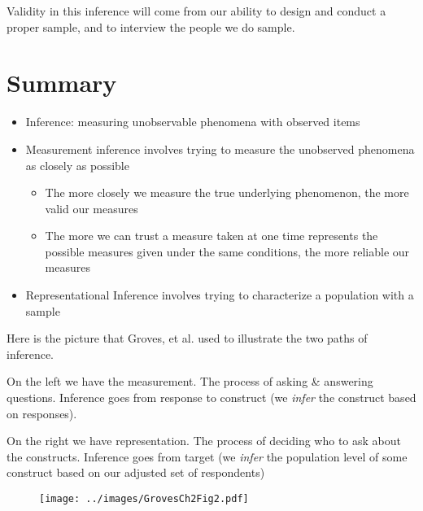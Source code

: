\documentclass[11pt]{lecturenotes}
\begin{document}
Validity in this inference will come from our ability to design and conduct a proper sample, and to interview the people we do sample. 

\section[10]{Summary}
\slide
\begin{itemize}
\item Inference: measuring unobservable phenomena with observed items
\item Measurement inference involves trying to measure the unobserved phenomena as closely as possible
\begin{itemize}
\item The more closely we measure the true underlying phenomenon, the more valid our measures
\item The more we can trust a measure taken at one time represents the possible measures given under the same conditions, the more reliable our measures
\end{itemize}
\item Representational Inference involves trying to characterize a population with a sample
\end{itemize}

Here is the picture that Groves, et al. used to illustrate the two paths of inference. 

\clearpage
On the left we have the measurement. The process of asking \& answering questions. Inference goes from response to construct (we \emph{infer} the construct based on responses). 

On the right we have representation. The process of deciding who to ask about the constructs. Inference goes from target (we \emph{infer} the population level of some construct based on our adjusted set of respondents)

\begin{figure}[h!]
\begin{center}
\texttt{[image: ../images/GrovesCh2Fig2.pdf]}
\end{center}
\end{figure}
%
%
%
\end{document}
